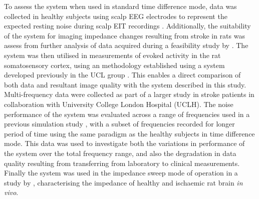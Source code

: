 To assess the system when used in standard time difference mode, data was collected in healthy subjects using scalp EEG electrodes to represent the expected resting noise during scalp EIT recordings \cite{Fabrizi_2006,fabrizi2007analysis,Romsauerova2006}. Additionally, the suitability of the system for imaging impedance changes resulting from stroke in rats was assess from further analysis of data acquired during a feasibility study by \citet{Dowrick_2016}. The system was then utilised in measurements of evoked activity in the rat somatosensory cortex, using an  methodology established using a system developed previously in the UCL group \cite{Oh2011,Aristovich_2016}. This enables a direct comparison of both data and resultant image quality with the system described in this study. Multi-frequency data were collected as part of a larger study in stroke patients in collaboration with University College London Hospital (UCLH). The noise performance of the system was evaluated across a range of frequencies used in a previous simulation study \cite{Malone2014a}, with a subset of frequencies recorded for longer period of time using the same paradigm as the healthy subjects in time difference mode. This data was used to investigate both the variations in performance of the system over the total frequency range, and also the degradation in data quality resulting from transferring from laboratory to clinical measurements. Finally the system was used in the impedance sweep mode of operation in a study by \citet{Dowrick_2015}, characterising the impedance of healthy and ischaemic rat brain \emph{in vivo}. 



